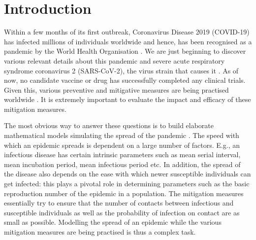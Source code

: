 \documentclass[aps,prd,10pt,twocolumn,nofootinbib]{revtex4-2}
\begin{document}
\section{Introduction}

Within a few months of its first outbreak, Coronavirus Disease 2019 (COVID-19) has infected millions of individuals worldwide and hence, has been recognised as a pandemic by the World Health Organisation \cite{WHO}. We are just beginning to discover various relevant details about this pandemic and severe acute respiratory syndrome coronavirus 2 (SARS-CoV-2), the virus strain that causes it \cite{Gorbalenya-2020,Wu-2020,Zhou-2020}. As of now, no candidate vaccine or drug has successfully completed any clinical trials.
Given this, various preventive and mitigative measures are being practised worldwide
\cite{Ferguson-2006,Huaiyu-2020}.
It is extremely important to evaluate the impact and efficacy of these mitigation measures. 

The most obvious way to answer these questions is to build elaborate mathematical models simulating the spread of the pandemic \cite{Imperial-college,time-dependent-beta,Singh-2020,Prem-2020,Berger,jia-2020,pandey-2020,Pribylova-2020,Das-2020,Castilho-2020,Sardar-2020}.
%
%
The speed with which an epidemic spreads is dependent on a large number of factors. E.g., an infectious disease has certain intrinsic parameters such as mean serial interval, mean incubation period, mean infectious period etc. In addition, the spread of the disease also depends on the ease with which newer susceptible individuals can get infected: this plays a pivotal role in determining parameters such as the basic reproduction number of the epidemic in a population. 
The mitigation measures essentially try to ensure that the number of contacts between infectious and susceptible individuals as well as the probability of infection on contact are as small as possible. 
Modelling the spread of an epidemic while the various mitigation measures are being practised is thus a complex task.
\end{document}
